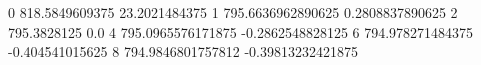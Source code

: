 0 818.5849609375 23.2021484375
1 795.6636962890625 0.2808837890625
2 795.3828125 0.0
4 795.0965576171875 -0.2862548828125
6 794.978271484375 -0.404541015625
8 794.9846801757812 -0.39813232421875
